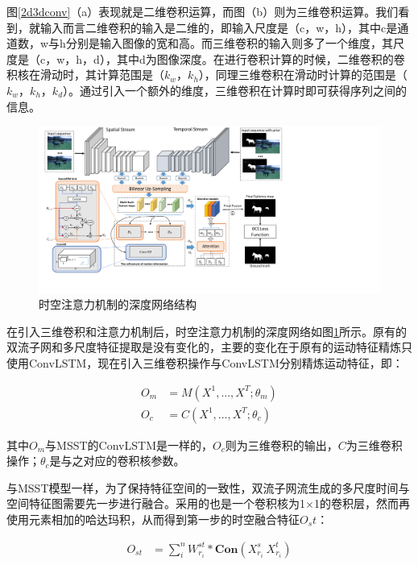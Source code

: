 图\ref{2d3dconv}（a）表现就是二维卷积运算，而图（b）则为三维卷积运算。我们看到，就输入而言二维卷积的输入是二维的，即输入尺度是（c，w，h），其中c是通道数，w与h分别是输入图像的宽和高。而三维卷积的输入则多了一个维度，其尺度是（c，w，h，d），其中d为图像深度。在进行卷积计算的时候，二维卷积的卷积核在滑动时，其计算范围是（$k_w$，$k_h$），同理三维卷积在滑动时计算的范围是（$k_w$，$k_h$，$k_d$）。通过引入一个额外的维度，三维卷积在计算时即可获得序列之间的信息。

\begin{figure}
\includegraphics[width=15cm]{figures/stan_framework}
\caption{时空注意力机制的深度网络结构}
\label{stan}
\end{figure}

在引入三维卷积和注意力机制后，时空注意力机制的深度网络如图\ref{stan}所示。原有的双流子网和多尺度特征提取是没有变化的，主要的变化在于原有的运动特征精炼只使用ConvLSTM，现在引入三维卷积操作与ConvLSTM分别精炼运动特征，即：

\begin{equation}
\label{P_motion}
\begin{aligned}
   O_{m}  &= M(X^1, ..., X^T; \theta_m) \\
   O_{c}  &= C(X^1, ..., X^T; \theta_c)
 \end{aligned}
\end{equation}

其中$O_{m}$与MSST的ConvLSTM是一样的，$O_{c}$则为三维卷积的输出，$C$为三维卷积操作；$\theta_c$是与之对应的卷积核参数。

与MSST模型一样，为了保持特征空间的一致性，双流子网流生成的多尺度时间与空间特征图需要先一步进行融合。采用的也是一个卷积核为1$\times$1的卷积层，然而再使用元素相加的哈达玛积，从而得到第一步的时空融合特征$O_st$：

\begin{equation}
\label{eq4_2}
\begin{aligned}
   O_{st}  &= \sum_{i}^{n} W^{st}_{r_i} * \textbf{Con}(X^{s}_{r_i} \ X^{t}_{r_i})
 \end{aligned}
\end{equation}

